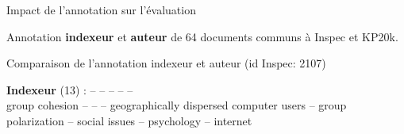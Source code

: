 \begin{frame}{Impact de l'annotation sur l'évaluation}

    Annotation \textbf{indexeur} et \textbf{auteur} de 64 documents communs à Inspec et KP20k.
    
    \vspace{.5em}

\begin{block}{Comparaison de l'annotation indexeur et auteur (id Inspec: 2107)}
    \hspace{.15cm}
    \footnotesize
    
    \textbf{Indexeur} (13) :  --  --  --  --  -- \\ group cohesion --  --   -- geographically dispersed computer users -- group polarization -- {social issues} -- {psychology} -- {internet}\\


\end{block}
\end{frame}
